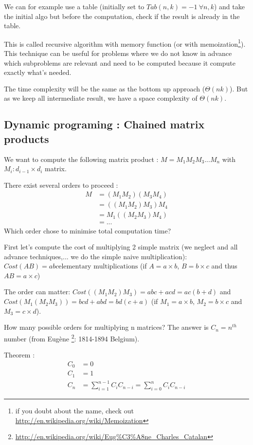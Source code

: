 We can for example use a table (initially set to $Tab(n,k) = -1 \ \forall n,k$) and take the initial algo but before the computation, check if the result is already in the table. 

This is called recursive algorithm with memory function (or with memoization\footnote{if you doubt about the name, check out \url{http://en.wikipedia.org/wiki/Memoization}}). This technique can be useful for problems where we do not know in advance which subproblems are relevant and need to be computed because it compute exactly what's needed.

The time complexity will be the same as the bottom up approach ($\Theta (nk)$). But as we keep all intermediate result, we have a space complexity of $\Theta (nk)$. 

\subsection{Dynamic programing : Chained matrix products}

We want to compute the following matrix product : $ M = M_1M_2M_3...M_n$ with $M_i:d_{i-1}\times d_{i}$ matrix.

There exist several orders to proceed :
\begin{align*}
M&=(M_1M_2)(M_3M_4)\\
 &= ((M_1M_2)M_3)M_4\\ 
 &= M_1((M_2M_3)M_4)\\
 &=...
\end{align*}
Which order chose to minimise total computation time?

First let's compute the cost of multiplying 2 simple matrix (we neglect  and all advance techniques,... we do the simple naive multiplication):\\
$Cost(AB) = abc\text{elementary multiplications}$ (if $A=a\times b$, $B=b\times c$ and thus $AB = a\times c$)

The order can matter: $Cost((M_1M_2)M_3) = abc+acd = ac(b+d)$ and $Cost(M_1(M_2M_3)) = bcd + abd=bd(c+a)$ (if $M_1=a\times b$, $M_2=b\times c$ and $M_3 = c\times d$).

How many possible orders for multiplying n matrices?
The answer is $C_n = n^{th}$ number
(from Eugène \footnote{\url{http://en.wikipedia.org/wiki/Eug\%C3\%A8ne_Charles_Catalan}}: 1814-1894 Belgium).

\begin{theorem}
Theorem :
\begin{align*}
C_0 &=0\\
C_1 &=1\\
C_n &= \sum_{i=1}^{n-1} C_iC_{n-i} = \sum_{i=0}^{n}C_iC_{n-i}
\end{align*}
\end{theorem}

